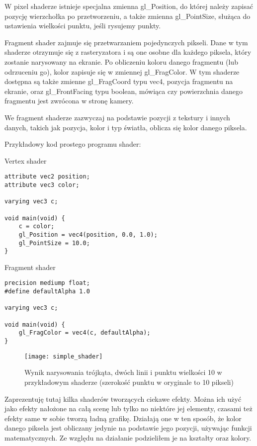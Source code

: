 W pixel shaderze istnieje specjalna zmienna gl\_Position, do której należy zapisać pozycję wierzchołka po przetworzeniu, a także zmienna gl\_PointSize, służąca do ustawienia wielko\'sci punktu, je\'sli rysujemy punkty.\bigskip

\smallskip

Fragment shader zajmuje się przetwarzaniem pojedynczych pikseli. Dane w tym shaderze otrzymuje się z rasteryzatora i są one osobne dla każdego piksela, który zostanie narysowany na ekranie. Po obliczeniu koloru danego fragmentu (lub odrzuceniu go), kolor zapisuje się w zmiennej gl\_FragColor. W tym shaderze dostępna są także zmienne gl\_FragCoord typu vec4, pozycja fragmentu na ekranie, oraz gl\_FrontFacing typu boolean, mówiąca czy powierzchnia danego fragmentu jest zwrócona w stronę kamery.

We fragment shaderze zazwyczaj na podstawie pozycji z tekstury i innych danych, takich jak pozycja, kolor i typ \'swiatła, oblicza się kolor danego piksela.\bigskip

\noindent Przykładowy kod prostego programu shader:\smallskip

{\large Vertex shader}
\begin{lstlisting}
attribute vec2 position;
attribute vec3 color;

varying vec3 c;

void main(void) {
	c = color;
	gl_Position = vec4(position, 0.0, 1.0);
	gl_PointSize = 10.0;
}
\end{lstlisting}\newpage

{\large Fragment shader}
\begin{lstlisting}
precision mediump float;
#define defaultAlpha 1.0

varying vec3 c;

void main(void) {
	gl_FragColor = vec4(c, defaultAlpha);
}
\end{lstlisting}
\begin{figure}[h]
	\centering
	\noindent\texttt{[image: simple\_shader]}
	\caption{Wynik narysowania trójkąta, dwóch linii i punktu wielko\'sci 10 w przykładowym shaderze (szeroko\'sć punktu w oryginale to 10 pikseli)}
\end{figure}\vfill

\newpage{}

Zaprezentuję tutaj kilka shaderów tworzących ciekawe efekty. Można ich użyć jako efekty nałożone na całą scenę lub tylko no niektóre jej elementy, czasami też efekty same w sobie tworzą ładną grafikę.
Działają one w ten sposób, że kolor danego piksela jest obliczany jedynie na podstawie jego pozycji, używając funkcji matematycznych. Ze względu na działanie podzieliłem je na kształty oraz kolory.\bigskip

